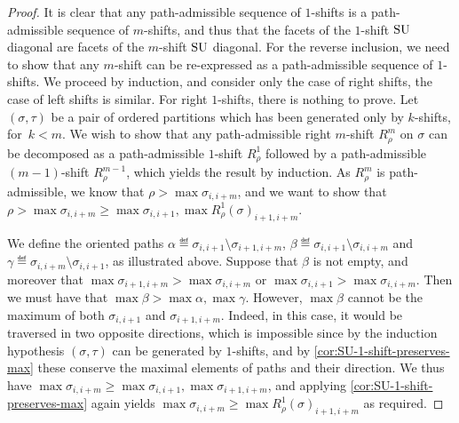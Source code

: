 \begin{proof}
It is clear that any path-admissible sequence of $1$-shifts is a path-admissible sequence of $m$-shifts, and thus that the facets of the $1$-shift $\mathrm{SU}$ diagonal are facets of the $m$-shift $\mathrm{SU}$ diagonal. 
For the reverse inclusion, we need to show that any $m$-shift can be re-expressed as a path-admissible sequence of $1$-shifts. 
We proceed by induction, and consider only the case of right shifts, the case of left shifts is similar.
For right $1$-shifts, there is nothing to prove.
Let $(\sigma,\tau)$ be a pair of ordered partitions which has been generated only by $k$-shifts, for~$k<m$. 
We wish to show that any path-admissible right $m$-shift $R_\rho^m$ on $\sigma$ can be decomposed as a path-admissible $1$-shift $R_\rho^{1}$ followed by a path-admissible $(m-1)$-shift $R_\rho^{m-1}$, which yields the result by induction.
As $R_\rho^{m}$ is path-admissible, we know that $\rho > \max \sigma_{i,i+m}$, and we want to show that 
$\rho>\max \sigma_{i,i+m}\geq \max \sigma_{i,i+1}, \max R_\rho^{1}(\sigma)_{i+1,i+m}$.
\begin{center}
\end{center}
We define the oriented paths $\alpha \eqdef \sigma_{i,i+1}\setminus \sigma_{i+1,i+m}$, $\beta \eqdef \sigma_{i,i+1}\setminus \sigma_{i,i+m}$ and $\gamma \eqdef \sigma_{i,i+m}\setminus \sigma_{i,i+1}$, as illustrated above. 
Suppose that $\beta$ is not empty, and moreover that $\max\sigma_{i+1,i+m}>\max\sigma_{i,i+m}$ or $\max \sigma_{i,i+1}> \max \sigma_{i,i+m}$.
Then we must have that $\max \beta> \max \alpha, \max \gamma$.
However, $\max\beta$ cannot be the maximum of both $\sigma_{i,i+1}$ and $\sigma_{i+1,i+m}$.
Indeed, in this case, it would be traversed in two opposite directions, which is impossible since by the induction hypothesis $(\sigma,\tau)$ can be generated by $1$-shifts, and by \cref{cor:SU-1-shift-preserves-max} these conserve the maximal elements of paths and their direction.
We thus have $\max \sigma_{i,i+m}\geq \max\sigma_{i,i+1}, \max \sigma_{i+1,i+m}$, and applying \cref{cor:SU-1-shift-preserves-max} again yields $\max \sigma_{i,i+m}\geq \max R_\rho^{1}(\sigma)_{i+1,i+m}$ as required.
\end{proof}

